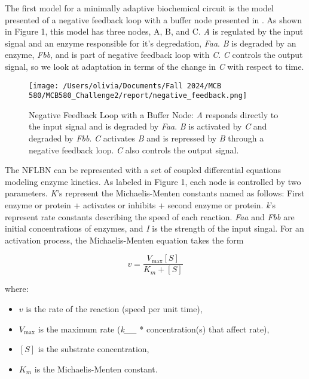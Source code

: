 \documentclass{article}
\begin{document}
The first model for a minimally adaptive biochemical circuit is the model presented of a negative feedback loop with a buffer node presented in \cite{challenge2paperD2L}. As shown in Figure 1, this model has three nodes, A, B, and C. \textit{A} is regulated by the input signal and an enzyme responsible for it's degredation, \textit{Faa}. \textit{B} is degraded by an enzyme, \textit{Fbb}, and is part of negative feedback loop with \textit{C}. \textit{C} controls the output signal, so we look at adaptation in terms of the change in \textit{C} with respect to time.   

\begin{figure}[H]
    \centering
    \texttt{[image: /Users/olivia/Documents/Fall 2024/MCB 580/MCB580\_Challenge2/report/negative\_feedback.png]}
    \caption{Negative Feedback Loop with a Buffer Node: \textit{A} responds directly to the input signal and is degraded by \textit{Faa}. \textit{B} is activated by \textit{C} and degraded by \textit{Fbb}. \textit{C} activates \textit{B} and is repressed by \textit{B} through a negative feedback loop. \textit{C} also controls the output signal.}
    \label{fig:1}
\end{figure}

The NFLBN can be represented with a set of coupled differential equations modeling enzyme kinetics. As labeled in Figure 1, each node is controlled by two parameters. \textit{K}'s represent the Michaelis-Menten constants named as follows: First enzyme or protein + activates or inhibits + second enzyme or protein. \textit{k}'s represent rate constants describing the speed of each reaction. \textit{Faa} and \textit{Fbb} are initial concentrations of enzymes, and \textit{I} is the strength of the input singal. For an activation process, the Michaelis-Menten equation takes the form 

\[
v = \frac{V_{\max} [S]}{K_m + [S]}
\]


where:
\begin{itemize}
    \item \(v\) is the rate of the reaction (speed per unit time), 
    \item \(V_{\max}\) is the maximum rate (\textit{k__} * concentration(s) that affect rate),
    \item \([S]\) is the substrate concentration,
    \item \(K_m\) is the Michaelis-Menten constant.
\end{itemize}
\end{document}
